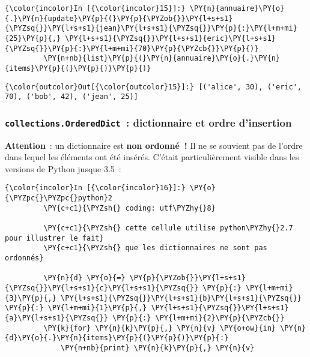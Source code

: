     \begin{Verbatim}[commandchars=\\\{\},frame=single,framerule=0.3mm,rulecolor=\color{cellframecolor}]
{\color{incolor}In [{\color{incolor}15}]:} \PY{n}{annuaire}\PY{o}{.}\PY{n}{update}\PY{p}{(}\PY{p}{\PYZob{}}\PY{l+s+s1}{\PYZsq{}}\PY{l+s+s1}{jean}\PY{l+s+s1}{\PYZsq{}}\PY{p}{:}\PY{l+m+mi}{25}\PY{p}{,} \PY{l+s+s1}{\PYZsq{}}\PY{l+s+s1}{eric}\PY{l+s+s1}{\PYZsq{}}\PY{p}{:}\PY{l+m+mi}{70}\PY{p}{\PYZcb{}}\PY{p}{)}
         \PY{n+nb}{list}\PY{p}{(}\PY{n}{annuaire}\PY{o}{.}\PY{n}{items}\PY{p}{(}\PY{p}{)}\PY{p}{)}
\end{Verbatim}


\begin{Verbatim}[commandchars=\\\{\},frame=single,framerule=0.3mm,rulecolor=\color{cellframecolor}]
{\color{outcolor}Out[{\color{outcolor}15}]:} [('alice', 30), ('eric', 70), ('bob', 42), ('jean', 25)]
\end{Verbatim}
            
    \hypertarget{collections.ordereddict-dictionnaire-et-ordre-dinsertion}{%
\subsubsection{\texorpdfstring{\texttt{collections.OrderedDict}~:
dictionnaire et ordre
d'insertion}{collections.OrderedDict~: dictionnaire et ordre d'insertion}}\label{collections.ordereddict-dictionnaire-et-ordre-dinsertion}}

    \textbf{Attention}~: un dictionnaire est \textbf{non ordonné~!} Il ne se
souvient pas de l'ordre dans lequel les éléments ont été insérés.
C'était particulièrement visible dans les versions de Python jusque
3.5~:

    \begin{Verbatim}[commandchars=\\\{\},frame=single,framerule=0.3mm,rulecolor=\color{cellframecolor}]
{\color{incolor}In [{\color{incolor}16}]:} \PY{o}{\PYZpc{}\PYZpc{}python}2
         \PY{c+c1}{\PYZsh{} coding: utf\PYZhy{}8}
         
         \PY{c+c1}{\PYZsh{} cette cellule utilise python\PYZhy{}2.7 pour illustrer le fait}
         \PY{c+c1}{\PYZsh{} que les dictionnaires ne sont pas ordonnés}
         
         \PY{n}{d} \PY{o}{=} \PY{p}{\PYZob{}}\PY{l+s+s1}{\PYZsq{}}\PY{l+s+s1}{c}\PY{l+s+s1}{\PYZsq{}} \PY{p}{:} \PY{l+m+mi}{3}\PY{p}{,} \PY{l+s+s1}{\PYZsq{}}\PY{l+s+s1}{b}\PY{l+s+s1}{\PYZsq{}} \PY{p}{:} \PY{l+m+mi}{1}\PY{p}{,} \PY{l+s+s1}{\PYZsq{}}\PY{l+s+s1}{a}\PY{l+s+s1}{\PYZsq{}} \PY{p}{:} \PY{l+m+mi}{2}\PY{p}{\PYZcb{}}
         \PY{k}{for} \PY{n}{k}\PY{p}{,} \PY{n}{v} \PY{o+ow}{in} \PY{n}{d}\PY{o}{.}\PY{n}{items}\PY{p}{(}\PY{p}{)}\PY{p}{:}
             \PY{n+nb}{print} \PY{n}{k}\PY{p}{,} \PY{n}{v}
\end{Verbatim}


